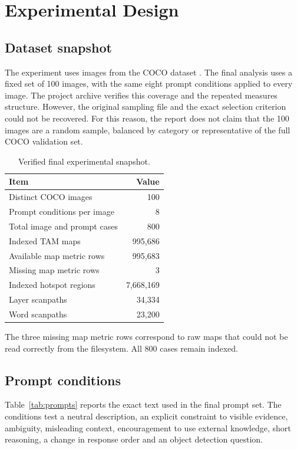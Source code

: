 \documentclass[11pt,a4paper]{article}
\begin{document}
\section{Experimental Design}

\subsection{Dataset snapshot}

The experiment uses images from the COCO dataset \cite{lin2014coco}. The final analysis uses a fixed set of 100 images, with the same eight prompt conditions applied to every image. The project archive verifies this coverage and the repeated measures structure. However, the original sampling file and the exact selection criterion could not be recovered. For this reason, the report does not claim that the 100 images are a random sample, balanced by category or representative of the full COCO validation set.

\begin{table}[H]
\centering
\small
\begin{tabular}{lr}
\toprule
Item & Value \\
\midrule
Distinct COCO images & 100 \\
Prompt conditions per image & 8 \\
Total image and prompt cases & 800 \\
Indexed TAM maps & 995,686 \\
Available map metric rows & 995,683 \\
Missing map metric rows & 3 \\
Indexed hotspot regions & 7,668,169 \\
Layer scanpaths & 34,334 \\
Word scanpaths & 23,200 \\
\bottomrule
\end{tabular}
\caption{Verified final experimental snapshot.}
\label{tab:snapshot}
\end{table}

The three missing map metric rows correspond to raw maps that could not be read correctly from the filesystem. All 800 cases remain indexed.

\subsection{Prompt conditions}

Table~\ref{tab:prompts} reports the exact text used in the final prompt set. The conditions test a neutral description, an explicit constraint to visible evidence, ambiguity, misleading context, encouragement to use external knowledge, short reasoning, a change in response order and an object detection question.
\end{document}

